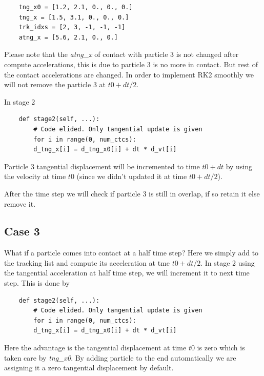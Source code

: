 \documentclass[11pt]{article}
\begin{document}
\begin{verbatim}
	tng_x0 = [1.2, 2.1, 0., 0., 0.]
	tng_x = [1.5, 3.1, 0., 0., 0.]
	trk_idxs = [2, 3, -1, -1, -1]
	atng_x = [5.6, 2.1, 0., 0.]
\end{verbatim}

Please note that the \emph{atng\_x} of contact with particle 3 is not changed after
compute accelerations, this is due to particle 3 is no more in contact. But
rest of the contact accelerations are changed. In order to implement RK2
smoothly we will not remove the particle 3 at \(t0+dt/2\).

In stage 2

\begin{verbatim}
	def stage2(self, ...):
	    # Code elided. Only tangential update is given
	    for i in range(0, num_ctcs):
		d_tng_x[i] = d_tng_x0[i] + dt * d_vt[i]
\end{verbatim}

Particle 3 tangential displacement will be incremented to time \(t0+dt\) by
using the velocity at time \(t0\) (since we didn't updated it at time
\(t0+dt/2\)).

After the time step we will check if particle 3 is still in overlap, if so
retain it else remove it.


\subsection{Case 3}
\label{sec:org2632dbe}
What if a particle comes into contact at a half time step? Here we simply add to
the tracking list and compute its acceleration at tme \(t0+dt/2\). In stage 2 using
the tangential acceleration at half time step, we will increment it to next time step.
This is done by

\begin{verbatim}
	def stage2(self, ...):
	    # Code elided. Only tangential update is given
	    for i in range(0, num_ctcs):
		d_tng_x[i] = d_tng_x0[i] + dt * d_vt[i]
\end{verbatim}

Here the advantage is the tangential displacement at time \(t0\) is zero which
is taken care by \emph{tng\_x0}. By adding particle to the end automatically we are
assigning it a zero tangential displacement by default.



\end{document}
